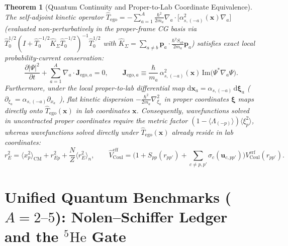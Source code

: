 \documentclass[11pt, a4paper]{article}
\newtheorem{theorem}{Theorem}[section]
\DeclareRobustCommand{\dd}{\mathrm{d}}
\begin{document}
\begin{theorem}[Quantum Continuity and Proper-to-Lab Coordinate Equivalence]
\label{thm:ego_divergence_and_radius}
The self-adjoint kinetic operator $\hat{T}_{\mathrm{ego}} = -\sum_{a=1}^A \frac{\hbar^2}{2m_a}\nabla_a\cdot\big[\alpha_{s,(-a)}^2(\mathbf{x})\nabla_a\big]$ (evaluated non-perturbatively in the proper-frame CG basis via $\hat{T}_0^{1/2}(I + \hat{T}_0^{-1/2}\hat{K}_\Sigma\hat{T}_0^{-1/2})^{-1}\hat{T}_0^{1/2}$ with $\hat{K}_\Sigma = \sum_{a\neq b}\mathbf{p}_a\cdot\frac{\hbar^2 S_{ab}}{2m_a}\mathbf{p}_a$) satisfies exact local probability-current conservation:
\begin{equation}
    \frac{\partial |\Psi|^2}{\partial t} + \sum_{a=1}^A \nabla_a \cdot \mathbf{J}_{\mathrm{ego},a} = 0, \qquad
    \mathbf{J}_{\mathrm{ego},a} \equiv \frac{\hbar}{m_a}\,\alpha_{s,(-a)}^2(\mathbf{x})\,\mathrm{Im}\!\big(\Psi^*\nabla_a\Psi\big).
    \label{eq:quantum_divergence_continuity}
\end{equation}
Furthermore, under the local proper-to-lab differential map $\dd\mathbf{x}_a = \alpha_{s,(-a)}\,\dd\boldsymbol{\xi}_a$ ($\partial_{\xi_a} = \alpha_{s,(-a)}\partial_{x_a}$~\cite{bairmosheh2026}), flat kinetic dispersion $-\frac{\hbar^2}{2m_a}\nabla_{\xi_a}^2$ in proper coordinates $\boldsymbol{\xi}$ maps directly onto $\hat{T}_{\mathrm{ego}}(\mathbf{x})$ in lab coordinates $\mathbf{x}$. Consequently, wavefunctions solved in uncontracted proper coordinates require the metric factor $(1 - \langle\Lambda_{(-p)}\rangle)\langle\xi_p^2\rangle$, whereas wavefunctions solved directly under $\hat{T}_{\mathrm{ego}}(\mathbf{x})$ already reside in lab coordinates:
\begin{equation}
    r_E^2 = \langle x_p^2\rangle_{\mathrm{CM}} + r_{Ep}^2 + \frac{N}{Z}\langle r_E^2\rangle_n, \qquad
    \hat{V}_{\mathrm{Coul}}^{\mathrm{eff}} = \Big(1 + S_{pp}(r_{pp'}) + \sum_{c\neq p,p'} \sigma_c(\mathbf{u}_{c,pp'})\Big)V_{\mathrm{Coul}}^{\mathrm{erf}}(r_{pp'}).
    \label{eq:eq128_and_coulomb}
\end{equation}
\end{theorem}

\section{\texorpdfstring{Unified Quantum Benchmarks ($A = 2\text{--}5$): Nolen--Schiffer Ledger and the $^5\text{He}$ Gate}{Unified Quantum Benchmarks (A = 2--5): Nolen-Schiffer Ledger and the 5He Gate}}
\label{sec:a2_to_a5_benchmarks}
\end{document}
